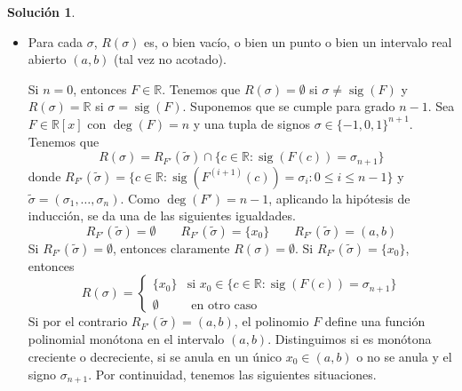 \documentclass[10pt]{article}
\theoremstyle{definition}
\newtheorem*{sol}{Solución}
\newcommand{\RR}{\mathbb{R}}
\newcommand{\RRx}{\mathbb{R}[x]}
\newcommand{\sig}{\operatorname{sig}}
\begin{document}
\begin{sol}\leavevmode
\begin{itemize}
    \item Para cada $\sigma$, $R(\sigma)$ es, o bien vacío, o bien un punto o bien un intervalo real abierto $(a,b)$ (tal vez no acotado).
    
    Si $n=0$, entonces $F\in\RR$. Tenemos que $R(\sigma)=\emptyset$ si $\sigma\neq\sig(F)$ y $R(\sigma)=\RR$ si $\sigma=\sig(F)$. Suponemos que se cumple para grado $n-1$. Sea $F\in\RRx$ con $\deg(F)=n$ y una tupla de signos $\sigma\in\{-1,0,1\}^{n+1}$. Tenemos que
    \[R(\sigma)=R_{F'}(\tilde{\sigma})\cap\{c\in\RR : \sig(F(c))=\sigma_{n+1}\}\]
    donde $R_{F'}(\tilde{\sigma})=\{c\in\RR : \sig(F^{(i+1)}(c))=\sigma_i : 0\leq i\leq n-1\}$ y $\tilde{\sigma}=(\sigma_1,\ldots,\sigma_n)$. Como $\deg(F')=n-1$, aplicando la hipótesis de inducción, se da una de las siguientes igualdades.
    \[R_{F'}(\tilde{\sigma})=\emptyset\qquad R_{F'}(\tilde{\sigma})=\{x_0\}\qquad R_{F'}(\tilde{\sigma})=(a,b)
    \]
    Si $R_{F'}(\tilde{\sigma})=\emptyset$, entonces claramente $R(\sigma)=\emptyset.$ Si $R_{F'}(\tilde{\sigma})=\{x_0\}$, entonces
    \[R(\sigma)=\left\{\begin{array}{cc}
        \{x_0\} & \text{si }x_0\in\{c\in\RR: \sig(F(c))=\sigma_{n+1}\}  \\
        \emptyset & \text{ en otro caso} 
    \end{array}\right.
    \]
    Si por el contrario $R_{F'}(\tilde{\sigma})=(a,b)$, el polinomio $F$ define una función polinomial monótona en el intervalo $(a,b)$. Distinguimos si es monótona creciente o decreciente, si se anula en un único $x_0\in(a,b)$ o no se anula y el signo $\sigma_{n+1}$. Por continuidad, tenemos las siguientes situaciones.
    

\end{itemize}
\end{sol}
\end{document}
